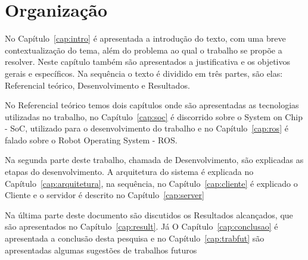 \section{Organização}

No Capítulo~\ref{cap:intro} é apresentada a introdução do texto, com uma breve contextualização do tema, além do problema ao qual o trabalho se propõe a resolver. Neste capítulo também são apresentados a justificativa e os objetivos gerais e específicos. Na sequência o texto é dividido em três partes, são elas: Referencial teórico, Desenvolvimento e Resultados.

No Referencial teórico temos dois capítulos onde são apresentadas as tecnologias utilizadas no trabalho, no Capítulo~\ref{cap:soc} é discorrido sobre o System on Chip - SoC, utilizado para o desenvolvimento do trabalho e no Capítulo~\ref{cap:ros} é falado sobre o Robot Operating System - ROS\@.

Na segunda parte deste trabalho, chamada de Desenvolvimento, são explicadas as etapas do desenvolvimento. A arquitetura do sistema é explicada no Capítulo~\ref{cap:arquitetura}, na sequência, no Capítulo~\ref{cap:cliente} é explicado o Cliente e o servidor é descrito no Capítulo~\ref{cap:server}

Na última parte deste documento são discutidos os Resultados alcançados, que são apresentados no Capítulo~\ref{cap:result}. Já O Capítulo~\ref{cap:conclusao} é apresentada a conclusão desta pesquisa e no Capítulo~\ref{cap:trabfut} são apresentadas algumas sugestões de trabalhos futuros 
